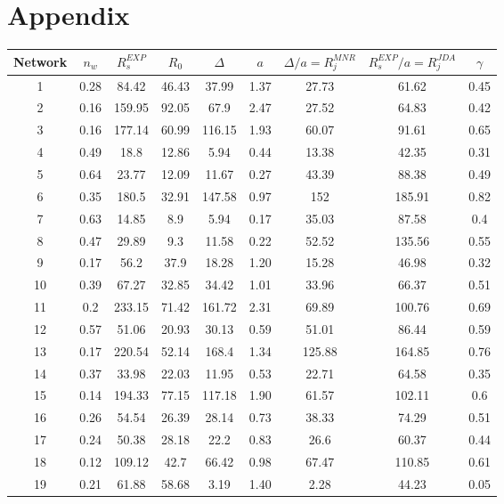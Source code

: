 \chapter{Appendix}

\begin{table}
\begin{center}
\begin{tabular}{| c | c c c c c c c c |}
\hline
Network & $n_w$ & $R_s^{EXP}$ & $R_0$  & $\Delta$ & $a$ & $\Delta/a = R_j^{MNR}$ & $R_s^{EXP}/a = R_j^{JDA}$
 & $\gamma$ \\ 
\hline
1 & 0.28 & 84.42 & 46.43 & 37.99 & 1.37 & 27.73 & 61.62 & 0.45 \\ 
2 & 0.16 & 159.95 & 92.05 & 67.9 & 2.47 & 27.52 & 64.83 & 0.42 \\ 
3 & 0.16 & 177.14 & 60.99 & 116.15 & 1.93 & 60.07 & 91.61 & 0.65 \\ 
4 & 0.49 & 18.8 & 12.86 & 5.94 & 0.44 & 13.38 & 42.35 & 0.31 \\ 
5 & 0.64 & 23.77 & 12.09 & 11.67 & 0.27 & 43.39 & 88.38 & 0.49 \\ 
6 & 0.35 & 180.5 & 32.91 & 147.58 & 0.97 & 152 & 185.91 & 0.82 \\ 
7 & 0.63 & 14.85 & 8.9 & 5.94 & 0.17 & 35.03 & 87.58 & 0.4 \\ 
8 & 0.47 & 29.89 & 9.3 & 11.58 & 0.22 & 52.52 & 135.56 & 0.55 \\ 
9 & 0.17 & 56.2 & 37.9 & 18.28 & 1.20 & 15.28 & 46.98 & 0.32 \\ 
10 & 0.39 & 67.27 & 32.85 & 34.42 & 1.01 & 33.96 & 66.37 & 0.51 \\ 
11 & 0.2 & 233.15 & 71.42 & 161.72 & 2.31 & 69.89 & 100.76 & 0.69 \\ 
12 & 0.57 & 51.06 & 20.93 & 30.13 & 0.59 & 51.01 & 86.44 & 0.59 \\ 
13 & 0.17 & 220.54 & 52.14 & 168.4 & 1.34 & 125.88 & 164.85 & 0.76 \\ 
14 & 0.37 & 33.98 & 22.03 & 11.95 & 0.53 & 22.71 & 64.58 & 0.35 \\ 
15 & 0.14 & 194.33 & 77.15 & 117.18 & 1.90 & 61.57 & 102.11 & 0.6 \\ 
16 & 0.26 & 54.54 & 26.39 & 28.14 & 0.73 & 38.33 & 74.29 & 0.51 \\ 
17 & 0.24 & 50.38 & 28.18 & 22.2 & 0.83 & 26.6 & 60.37 & 0.44 \\ 
18 & 0.12 & 109.12 & 42.7 & 66.42 & 0.98 & 67.47 & 110.85 & 0.61 \\ 
19 & 0.21 & 61.88 & 58.68 & 3.19 & 1.40 & 2.28 & 44.23 & 0.05 \\ 

\end{tabular}
\end{center}
\end{table}
